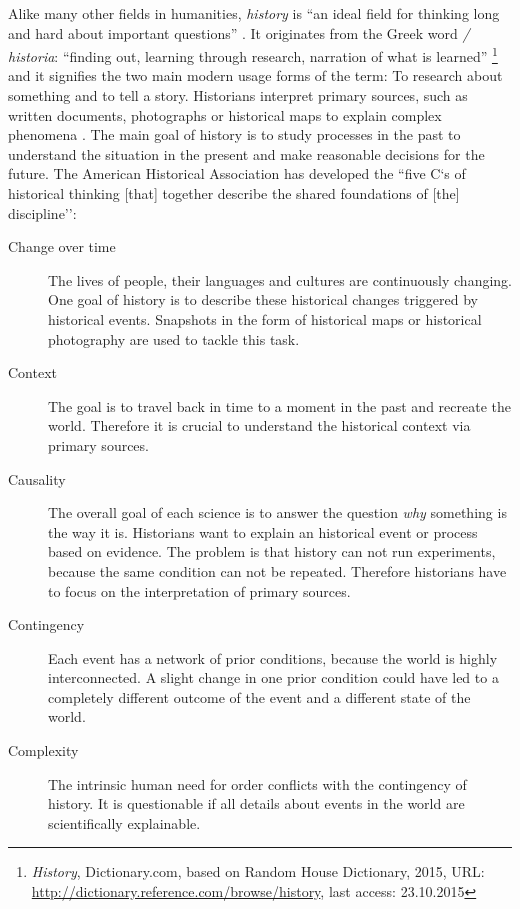 Alike many other fields in humanities, \emph{history} is ``an ideal field for thinking long and hard about important questions''
\cite{ahaFiveCs}.
It originates from the Greek word \emph{\textIota\textsigma\texttau\textomikron\textrho\textiota\textalpha / historia}: ``finding out, learning through research, narration of what is learned''
\footnote{
  \emph{History},
  Dictionary.com, based on Random House Dictionary, 2015,
  URL: \url{http://dictionary.reference.com/browse/history},
  last access: 23.10.2015
}
and it signifies the two main modern usage forms of the term: To research about something and to tell a story. Historians interpret primary sources, such as written documents, photographs or historical maps to explain complex phenomena \cite[pp.4-7]{knowles2008placing}. The main goal of history is to study processes in the past to understand the situation in the present and make reasonable decisions for the future. The American Historical Association has developed the ``five C`s of historical thinking [that] together describe the shared foundations of [the] discipline''\cite{ahaFiveCs}:

\vspace{-1em}
\begin{description} %
  \item[Change over time]
  The lives of people, their languages and cultures are continuously changing. One goal of history is to describe these historical changes triggered by historical events. Snapshots in the form of historical maps or historical photography are used to tackle this task.
  \item[Context] The goal is to travel back in time to a moment in the past and recreate the world. Therefore it is crucial to understand the historical context via primary sources.
  \item[Causality]
  The overall goal of each science is to answer the question \emph{why} something is the way it is. Historians want to explain an historical event or process based on evidence. The problem is that history can not run experiments, because the same condition can not be repeated. Therefore historians have to focus on the interpretation of primary sources.
  \item[Contingency]
  Each event has a network of prior conditions, because the world is highly interconnected. A slight change in one prior condition could have led to a completely different outcome of the event and a different state of the world.
  \item[Complexity]
  The intrinsic human need for order conflicts with the contingency of history. It is questionable if all details about events in the world are scientifically explainable.
\end{description}

